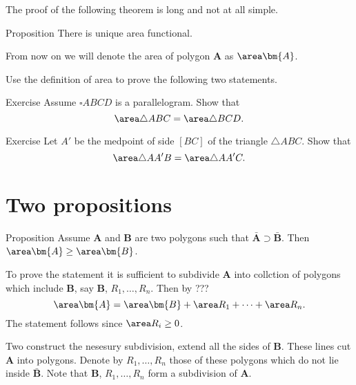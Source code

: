 {The proof of the following theorem is long and not at all simple.

\begin{thm}{Proposition}
There is unique area functional.
\end{thm}

From now on we will denote the area of polygon $\bm{A}$ as $\area \bm{A}$.

Use the definition of area to prove the following two statements.


\begin{thm}{Exercise}
Assume $\square ABCD$ is a parallelogram.
Show that 
\[\area\triangle ABC=\area\triangle BCD.\]

\end{thm}

\begin{thm}{Exercise}
Let $A'$ be the medpoint of side $[BC]$ of the triangle $\triangle ABC$.
Show that 
\[\area\triangle AA'B=\area\triangle AA'C.\]

\end{thm}



















\section*{Two propositions}

\begin{thm}{Proposition}\label{prop:monotonicity-of-area}
Assume $\bm{A}$ and $\bm{B}$ are two polygons such that $\bar{\bm{A}}\supset \bar{\bm{B}}$.
Then $\area \bm{A}\ge \area \bm{B}$.
\end{thm}

To prove the statement it is sufficient to subdivide $\bm{A}$ into collction of polygons which include $\bm{B}$, say $\bm{B}$, $R_1,\dots,R_n$.
Then by ???
\[\area \bm{A}=\area \bm{B}+\area R_1+\dots +\area R_n.\]
The statement follows since $\area R_i\ge 0$.

Two construct the nesesury subdivision, extend all the sides of $\bm{B}$.
These lines cut $\bm{A}$ into polygons.
Denote by $R_1,\dots,R_n$ those of these polygons which do not lie inside $\bar{\bm{B}}$.
Note that $\bm{B}$, $R_1,\dots,R_n$ form a subdivision of $\bm{A}$.


}
